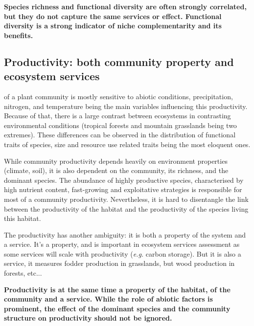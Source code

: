 


\textbf{Species richness and functional diversity are often strongly correlated, but they do not capture the same services or effect. Functional diversity is a strong indicator of niche complementarity and its benefits.}

\subsection{Productivity: both community property and ecosystem services}

 of a plant community is mostly sensitive to abiotic conditions, precipitation, nitrogen, and temperature being the main variables influencing this productivity. Because of that, there is a large contrast between ecosystems in contrasting environmental conditions (tropical forests and mountain grasslands being two extremes). These differences can be observed in the distribution of functional traits of species, size and resource use related traits being the most eloquent ones. 

While community productivity depends heavily on environment properties (climate, soil), it is also dependent on the community, its richness, and the dominant species. The abundance of highly productive species, characterised by high nutrient content, fast-growing and exploitative strategies is responsible for most of a community productivity. Nevertheless, it is hard to disentangle the link between the productivity of the habitat and the productivity of the species living this habitat.

The productivity has another ambiguity: it is both a property of the system and a service. It's a property, and is important in ecosystem services assessment as some services will scale with productivity (\textit{e.g.} carbon storage). But it is also a service, it measures fodder production in grasslands, but wood production in forests, etc...



\textbf{Productivity is at the same time a property of the habitat, of the community and a service. While the role of abiotic factors is prominent, the effect of the dominant species and the community structure on productivity should not be ignored. }

